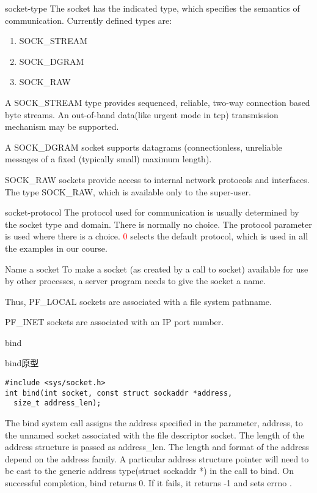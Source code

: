 \documentclass{beamer}
\begin{document}
\begin{frame}{socket-type}
     The socket has the indicated type, which specifies the semantics of communication.  Currently defined types are:
\begin{enumerate}
\item
           SOCK\_STREAM
        \item   SOCK\_DGRAM
          \item SOCK\_RAW
\end{enumerate}
     A SOCK\_STREAM type provides sequenced, reliable, two-way connection based byte streams.  An out-of-band data(like urgent mode in tcp) transmission mechanism may be supported.  
     
     A SOCK\_DGRAM socket supports datagrams (connectionless, unreliable messages of a fixed (typically small) maximum length). 
     
      SOCK\_RAW sockets provide access to internal network protocols and interfaces.  The type
     SOCK\_RAW, which is available only to the super-user.
\end{frame}
\begin{frame}{socket-protocol}
The protocol used for communication is usually determined by the socket type and domain. There is normally no choice. The protocol parameter is used where there is a choice. \textcolor{red}{0 }selects the default protocol, which is used in all the examples in our course.
\end{frame}
\begin{frame}{Name a socket}
To make a socket (as created by a call to socket) available for use by other processes, a server program needs to give the socket a name. 

Thus, PF\_LOCAL sockets are associated with a file system pathname. 

PF\_INET sockets are associated with an IP port number.
\end{frame}
\begin{frame}[fragile]{bind}
\begin{block}{bind原型}
\begin{verbatim}
#include <sys/socket.h>
int bind(int socket, const struct sockaddr *address, 
  size_t address_len);
\end{verbatim}
\end{block}
The bind system call assigns the address specified in the parameter, address, to the unnamed socket associated with the file descriptor socket. The length of the address structure is passed as address\_len.
The length and format of the address depend on the address family. A particular address structure pointer will need to be cast to the generic address type(struct sockaddr *) in the call to bind.
On successful completion, bind returns 0. If it fails, it returns -1 and sets errno .
\end{frame}
\end{document}

